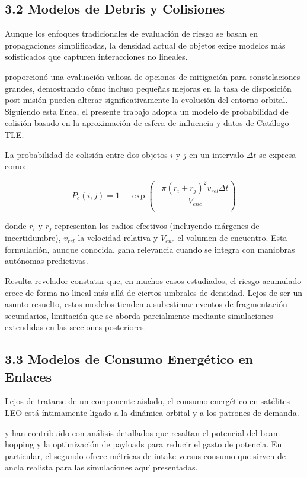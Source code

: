 \subsection{3.2 Modelos de Debris y Colisiones}

Aunque los enfoques tradicionales de evaluación de riesgo se basan en propagaciones simplificadas, la densidad actual de objetos exige modelos más sofisticados que capturen interacciones no lineales. 

\cite{Lewis2020} proporcionó una evaluación valiosa de opciones de mitigación para constelaciones grandes, demostrando cómo incluso pequeñas mejoras en la tasa de disposición post-misión pueden alterar significativamente la evolución del entorno orbital. Siguiendo esta línea, el presente trabajo adopta un modelo de probabilidad de colisión basado en la aproximación de esfera de influencia y datos de Catálogo TLE.

La probabilidad de colisión entre dos objetos $i$ y $j$ en un intervalo $\Delta t$ se expresa como:

\begin{equation}
P_{c}(i,j) = 1 - \exp\left( -\frac{\pi (r_i + r_j)^2 v_{rel} \Delta t}{V_{enc}} \right)
\label{eq:prob_colision}
\end{equation}

donde $r_i$ y $r_j$ representan los radios efectivos (incluyendo márgenes de incertidumbre), $v_{rel}$ la velocidad relativa y $V_{enc}$ el volumen de encuentro. Esta formulación, aunque conocida, gana relevancia cuando se integra con maniobras autónomas predictivas.

Resulta revelador constatar que, en muchos casos estudiados, el riesgo acumulado crece de forma no lineal más allá de ciertos umbrales de densidad. Lejos de ser un asunto resuelto, estos modelos tienden a subestimar eventos de fragmentación secundarios, limitación que se aborda parcialmente mediante simulaciones extendidas en las secciones posteriores.

\subsection{3.3 Modelos de Consumo Energético en Enlaces}

Lejos de tratarse de un componente aislado, el consumo energético en satélites LEO está íntimamente ligado a la dinámica orbital y a los patrones de demanda. 

\cite{Fastenbauer2025} y \cite{Klemettinen2025} han contribuido con análisis detallados que resaltan el potencial del beam hopping y la optimización de payloads para reducir el gasto de potencia. En particular, el segundo ofrece métricas de intake versus consumo que sirven de ancla realista para las simulaciones aquí presentadas.

